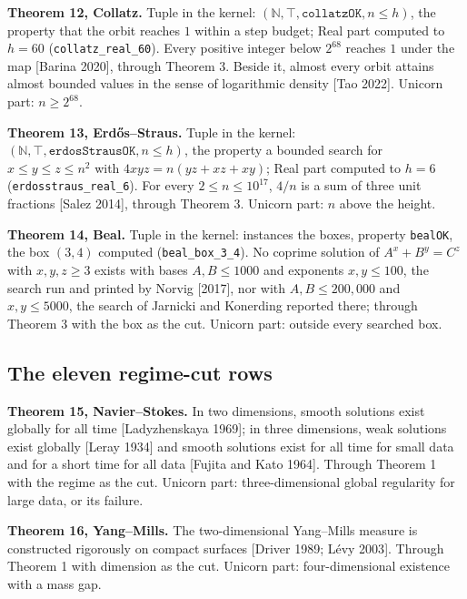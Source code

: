 \documentclass[10pt]{article}
\begin{document}
\textbf{Theorem 12, Collatz.} Tuple in the kernel:
\((\mathbb{N}, \top, \texttt{collatzOK}, n \le h)\), the property that
the orbit reaches \(1\) within a step budget; Real part computed to
\(h = 60\) (\texttt{collatz\_real\_60}). Every positive integer below
\(2^{68}\) reaches \(1\) under the map {[}Barina 2020{]}, through
Theorem 3. Beside it, almost every orbit attains almost bounded values
in the sense of logarithmic density {[}Tao 2022{]}. Unicorn part:
\(n \ge 2^{68}\).

\textbf{Theorem 13, Erdős--Straus.} Tuple in the kernel:
\((\mathbb{N}, \top, \texttt{erdosStrausOK}, n \le h)\), the property a
bounded search for \(x \le y \le z \le n^2\) with
\(4xyz = n(yz + xz + xy)\); Real part computed to \(h = 6\)
(\texttt{erdosstraus\_real\_6}). For every \(2 \le n \le 10^{17}\),
\(4/n\) is a sum of three unit fractions {[}Salez 2014{]}, through
Theorem 3. Unicorn part: \(n\) above the height.

\textbf{Theorem 14, Beal.} Tuple in the kernel: instances the boxes,
property \texttt{bealOK}, the box \((3, 4)\) computed
(\texttt{beal\_box\_3\_4}). No coprime solution of \(A^x + B^y = C^z\)
with \(x, y, z \ge 3\) exists with bases \(A, B \le 1000\) and exponents
\(x, y \le 100\), the search run and printed by Norvig {[}2017{]}, nor
with \(A, B \le 200{,}000\) and \(x, y \le 5000\), the search of
Jarnicki and Konerding reported there; through Theorem 3 with the box as
the cut. Unicorn part: outside every searched box.

\hypertarget{the-eleven-regime-cut-rows}{%
\subsection{The eleven regime-cut
rows}\label{the-eleven-regime-cut-rows}}

\textbf{Theorem 15, Navier--Stokes.} In two dimensions, smooth solutions
exist globally for all time {[}Ladyzhenskaya 1969{]}; in three
dimensions, weak solutions exist globally {[}Leray 1934{]} and smooth
solutions exist for all time for small data and for a short time for all
data {[}Fujita and Kato 1964{]}. Through Theorem 1 with the regime as
the cut. Unicorn part: three-dimensional global regularity for large
data, or its failure.

\textbf{Theorem 16, Yang--Mills.} The two-dimensional Yang--Mills
measure is constructed rigorously on compact surfaces {[}Driver 1989;
Lévy 2003{]}. Through Theorem 1 with dimension as the cut. Unicorn part:
four-dimensional existence with a mass gap.
\end{document}
